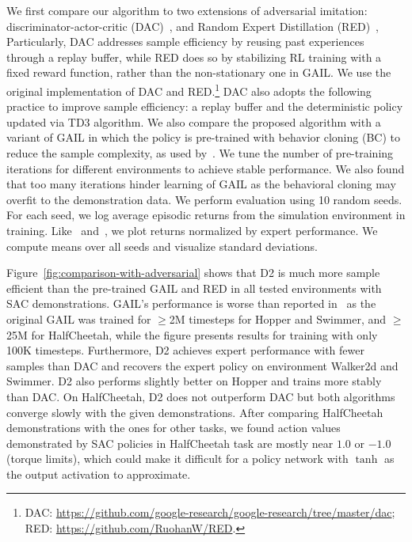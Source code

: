 \documentclass[letterpaper]{article} %
\begin{document}
We first compare our algorithm to two extensions of adversarial imitation:
discriminator-actor-critic (DAC)~\cite{kostrikov2018discriminator},
and Random Expert Distillation (RED)~\cite{wang2019random},
Particularly, DAC addresses sample efficiency by reusing past experiences through a replay buffer,
while RED does so by stabilizing RL training with a fixed reward function,
rather than the non-stationary one in GAIL.
We use the original implementation of DAC and RED.\footnote{DAC: \url{https://github.com/google-research/google-research/tree/master/dac}; RED: \url{https://github.com/RuohanW/RED}.}
DAC also adopts the following practice to improve sample efficiency:
a replay buffer and the deterministic policy updated via TD3 algorithm.
We also compare the proposed algorithm with a variant of GAIL in which the policy is pre-trained with behavior cloning (BC) to reduce the sample complexity, as used by~\citet{ho2016generative}.
We tune the number of pre-training iterations for different environments to achieve stable performance.
We also found that too many iterations hinder learning of GAIL as the behavioral cloning may  overfit to the demonstration data.
We perform evaluation using 10 random seeds.
For each seed, we log average episodic returns from the simulation environment in training.
Like~\citet{ho2016generative} and~\citet{kostrikov2018discriminator}, we plot returns normalized by expert performance.
We compute means over all seeds and visualize standard deviations.


Figure~\ref{fig:comparison-with-adversarial}
shows that D2 is much more sample efficient than the pre-trained GAIL and RED in all tested environments with SAC demonstrations.
GAIL's performance is worse than reported in~\cite{ho2016generative} as the original GAIL was trained for $\geq$2M timesteps for Hopper and Swimmer, and $\geq$25M for HalfCheetah, while the figure presents results for training with only 100K timesteps.
Furthermore, D2 achieves expert performance with fewer samples than DAC and recovers the expert policy on environment Walker2d and Swimmer.
D2 also performs slightly better on Hopper and trains more stably than DAC.
On HalfCheetah, D2 does not outperform DAC but both algorithms converge slowly with the given demonstrations.
After comparing HalfCheetah demonstrations with the ones for other tasks,
we found action values demonstrated by SAC policies in HalfCheetah task are mostly near $1.0$ or $-1.0$ (torque limits),
which could make it difficult for a policy network with $\tanh$ as the output activation to approximate.
\end{document}
